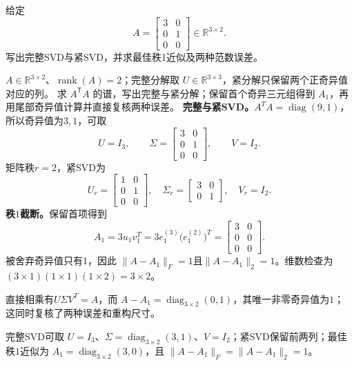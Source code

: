 \label{struct:V4-C03-CH18}
\label{struct:V4-C03-CH32}
\begin{example}\label{exm:V4-C03-tall}
给定
\[
A=\begin{bmatrix}
3&0\\
0&1\\
0&0
\end{bmatrix}\in\mathbb R^{3\times2}.
\]
写出完整SVD与紧SVD，并求最佳秩1近似及两种范数误差。

\label{struct:V4-C03-CH33}
\end{example}
\begin{solution}
\SolGiven $A\in\mathbb R^{3\times2}$、$\operatorname{rank}(A)=2$；完整分解取 $U\in\mathbb R^{3\times3}$，紧分解只保留两个正奇异值对应的列。
\SolPlan 求 $A^{\mathsf T}A$ 的谱，写出完整与紧分解；保留首个奇异三元组得到 $A_1$，再用尾部奇异值计算并直接复核两种误差。
\SolDerive
\textbf{完整与紧SVD。}$A^TA=\operatorname{diag}(9,1)$，所以奇异值为$3,1$，可取
\[
U=I_3,\qquad
\Sigma=\begin{bmatrix}3&0\\0&1\\0&0\end{bmatrix},\qquad
V=I_2.
\]
矩阵秩$r=2$，紧SVD为
\[
U_r=\begin{bmatrix}1&0\\0&1\\0&0\end{bmatrix},\quad
\Sigma_r=\begin{bmatrix}3&0\\0&1\end{bmatrix},\quad
V_r=I_2.
\]
\textbf{秩$1$截断。}保留首项得到
\[
A_1=3u_1v_1^T
=3e_1^{(3)}\bigl(e_1^{(2)}\bigr)^T=
\begin{bmatrix}3&0\\0&0\\0&0\end{bmatrix}.
\]
被舍弃奇异值只有1，因此
$\|A-A_1\|_F=1$且$\|A-A_1\|_2=1$。维数检查为
$(3\times1)(1\times1)(1\times2)=3\times2$。

\SolCheck 直接相乘有$U\Sigma V^T=A$，而
$A-A_1=\operatorname{diag}_{3\times2}(0,1)$，其唯一非零奇异值为$1$；这同时复核了两种误差和重构尺寸。

\SolAnswer 完整SVD可取 $U=I_3$、$\Sigma=\operatorname{diag}_{3\times2}(3,1)$、$V=I_2$；紧SVD保留前两列；最佳秩$1$近似为 $A_1=\operatorname{diag}_{3\times2}(3,0)$，且 $\|A-A_1\|_F=\|A-A_1\|_2=1$。
\end{solution}


